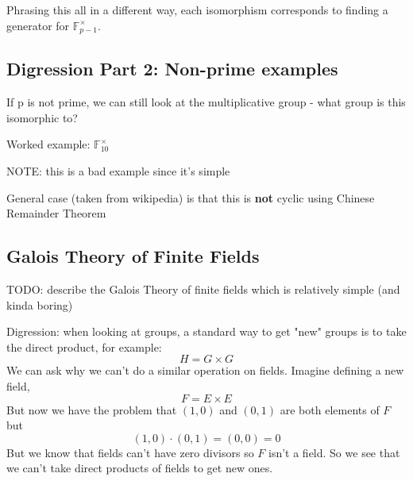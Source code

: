 \documentclass{article}
\begin{document}
Phrasing this all in a different way, each isomorphism corresponds to finding a generator for $ \mathbb{F}_{p-1}^{\times} $.

\subsection{Digression Part 2: Non-prime examples}

If p is not prime, we can still look at the multiplicative group - what group is this isomorphic to?

Worked example: $ \mathbb{F}_{10}^{\times} $

NOTE: this is a bad example since it's simple

General case (taken from wikipedia) is that this is \textbf{not} cyclic using Chinese Remainder Theorem

\subsection{Galois Theory of Finite Fields}
TODO: describe the Galois Theory of finite fields which is relatively simple (and kinda boring)

Digression: when looking at groups, a standard way to get "new" groups is to take the direct product, for example:
\begin{equation}
H = G \times G
\end{equation}
We can ask why we can't do a similar operation on fields. Imagine defining a new field,
\begin{equation}
F = E \times E
\end{equation}
But now we have the problem that \((1, 0)\) and \((0, 1)\) are both elements of $ F $ but
\begin{equation}
(1, 0) \cdot (0, 1) = (0, 0) = 0
\end{equation}
But we know that fields can't have zero divisors so $ F $ isn't a field. So we see that we can't take direct products of fields to get new ones.
\end{document}
